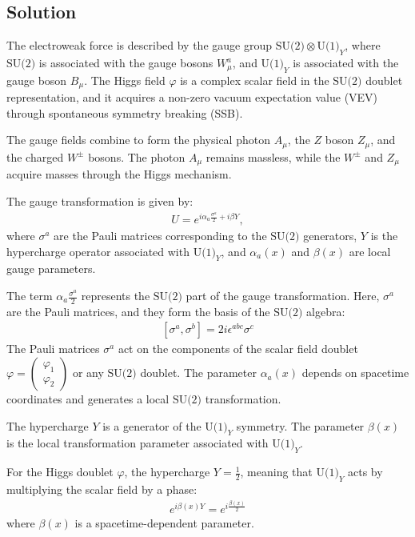 \subsection*{Solution}
The electroweak force is described by the gauge group $\text{SU(2)} \otimes \text{U(1)}_Y$, where $\text{SU(2)}$ is associated with the gauge bosons $W_\mu^a$, and $\text{U(1)}_Y$ is associated with the gauge boson $B_\mu$. The Higgs field $\varphi$ is a complex scalar field in the $\text{SU(2)}$ doublet representation, and it acquires a non-zero vacuum expectation value (VEV) through spontaneous symmetry breaking (SSB).

The gauge fields combine to form the physical photon $A_\mu$, the $Z$ boson $Z_\mu$, and the charged $W^\pm$ bosons. The photon $A_\mu$ remains massless, while the $W^\pm$ and $Z_\mu$ acquire masses through the Higgs mechanism.

The gauge transformation is given by:
\begin{align}
    U = e^{\displaystyle i \alpha_a \frac{\sigma^a}{2} + i \beta Y},
\end{align}
where $\sigma^a$ are the Pauli matrices corresponding to the $\text{SU(2)}$ generators, $Y$ is the hypercharge operator associated with $\text{U(1)}_Y$, and $\alpha_a(x)$ and $\beta(x)$ are local gauge parameters.

The term $\displaystyle\alpha_a \frac{\sigma^a}{2}$ represents the $\text{SU(2)}$ part of the gauge transformation. Here, $\sigma^a$ are the Pauli matrices, and they form the basis of the $\text{SU(2)}$ algebra:
\begin{align}
    \left[\sigma^a, \sigma^b\right] = 2i \epsilon^{abc} \sigma^c
\end{align}
The Pauli matrices $\sigma^a$ act on the components of the scalar field doublet $\varphi = \begin{pmatrix} \varphi_1 \\ \varphi_2 \end{pmatrix}$ or any $\text{SU(2)}$ doublet. The parameter $\alpha_a(x)$ depends on spacetime coordinates and generates a local $\text{SU(2)}$ transformation.

The hypercharge $Y$ is a generator of the $\text{U(1)}_Y$ symmetry. The parameter $\beta(x)$ is the local transformation parameter associated with $\text{U(1)}_Y$. 

For the Higgs doublet $\varphi$, the hypercharge $\displaystyle Y = \frac{1}{2}$, meaning that $\text{U(1)}_Y$ acts by multiplying the scalar field by a phase:
\begin{align}
    e^{i \beta(x) Y} = e^{\displaystyle i\frac{\beta(x)}{2}}
\end{align}
where $\beta(x)$ is a spacetime-dependent parameter.

